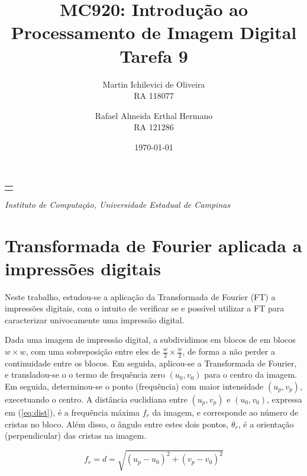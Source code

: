 \documentclass[10pt,a4paper]{article}
\makeatletter
\let\@institution\empty
\def\institution#1{\def\@institution{#1}}
\renewcommand{\maketitle}{
    \begin{center}
        {\Large\bfseries\@title\par\medskip}
        {\large
            \begin{tabular}[t]{c}%
                \@author
        \end{tabular}\par\medskip}
        {\itshape\@institution\par}
        {\itshape\@date\par}
\end{center}}
\makeatother
\begin{document}

\title{MC920: Introdução ao Processamento de Imagem Digital\\Tarefa 9}
\author{
    \begin{minipage}{6cm}
        \centering
        Martin Ichilevici de Oliveira\\
        RA 118077
    \end{minipage}
    \and
    \begin{minipage}{6cm}
        \centering
        Rafael Almeida Erthal Hermano\\
        RA 121286
    \end{minipage}
}
\institution{Instituto de Computação, Universidade Estadual de Campinas}
\date{\today}

\maketitle

\section{Transformada de Fourier aplicada a impressões digitais}
Neste trabalho, estudou-se a aplicação da Transformada de Fourier (FT) a impressões digitais, com o intuito de verificar se e possível utilizar a FT para caracterizar univocamente uma impressão digital.

Dada uma imagem de impressão digital, a subdividimos em blocos de em blocos $w \times w$, com uma sobreposição entre eles de $\frac{w}{2}\times\frac{w}{2}$, de forma a não perder a continuidade entre os blocos. Em seguida, aplicou-se a Transformada de Fourier, e transladou-se o o termo de frequência zero $(u_0, v_0)$ para o centro da imagem. Em seguida, determinou-se o ponto (frequência) com maior intensidade $(u_p, v_p)$, execetuando o centro. A distância euclidiana entre $(u_p, v_p)$ e $(u_0, v_0)$, expressa em (\ref{eq:dist}), é a frequência máxima $f_r$ da imagem, e corresponde ao número de cristas no bloco. Além disso, o ângulo entre estes dois pontos, $\theta_r$, é a orientação (perpendicular) das cristas na imagem.

\begin{equation}
    f_r = d = \sqrt{(u_p - u_0)^2 + (v_p - v_0)^2}
    \label{eq:dist}
\end{equation}
\end{document}
